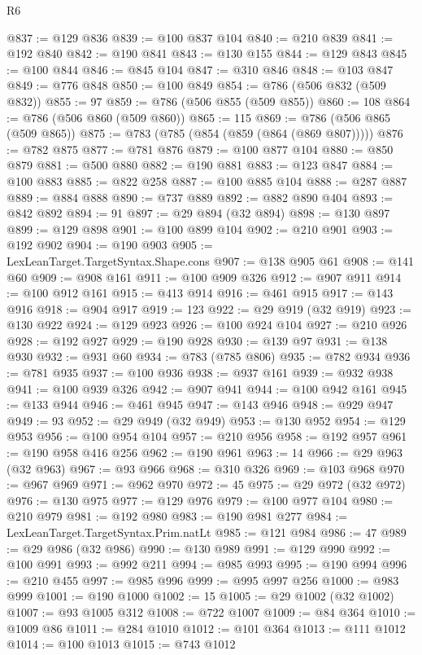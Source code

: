 \begin{lexlean}{R6}
\begin{coremodule}
@837 := @129 @836
@839 := @100 @837 @104
@840 := @210 @839
@841 := @192 @840
@842 := @190 @841
@843 := @130 @155
@844 := @129 @843
@845 := @100 @844
@846 := @845 @104
@847 := @310 @846
@848 := @103 @847
@849 := @776 @848
@850 := @100 @849
@854 := @786 (@506 @832 (@509 @832))
@855 := 97
@859 := @786 (@506 @855 (@509 @855))
@860 := 108
@864 := @786 (@506 @860 (@509 @860))
@865 := 115
@869 := @786 (@506 @865 (@509 @865))
@875 := @783 (@785 (@854 (@859 (@864 (@869 @807)))))
@876 := @782 @875
@877 := @781 @876
@879 := @100 @877 @104
@880 := @850 @879
@881 := @500 @880
@882 := @190 @881
@883 := @123 @847
@884 := @100 @883
@885 := @822 @258
@887 := @100 @885 @104
@888 := @287 @887
@889 := @884 @888
@890 := @737 @889
@892 := @882 @890 @404
@893 := @842 @892
@894 := 91
@897 := @29 @894 (@32 @894)
@898 := @130 @897
@899 := @129 @898
@901 := @100 @899 @104
@902 := @210 @901
@903 := @192 @902
@904 := @190 @903
@905 := LexLeanTarget.TargetSyntax.Shape.cons
@907 := @138 @905 @61
@908 := @141 @60
@909 := @908 @161
@911 := @100 @909 @326
@912 := @907 @911
@914 := @100 @912 @161
@915 := @413 @914
@916 := @461 @915
@917 := @143 @916
@918 := @904 @917
@919 := 123
@922 := @29 @919 (@32 @919)
@923 := @130 @922
@924 := @129 @923
@926 := @100 @924 @104
@927 := @210 @926
@928 := @192 @927
@929 := @190 @928
@930 := @139 @97
@931 := @138 @930
@932 := @931 @60
@934 := @783 (@785 @806)
@935 := @782 @934
@936 := @781 @935
@937 := @100 @936
@938 := @937 @161
@939 := @932 @938
@941 := @100 @939 @326
@942 := @907 @941
@944 := @100 @942 @161
@945 := @133 @944
@946 := @461 @945
@947 := @143 @946
@948 := @929 @947
@949 := 93
@952 := @29 @949 (@32 @949)
@953 := @130 @952
@954 := @129 @953
@956 := @100 @954 @104
@957 := @210 @956
@958 := @192 @957
@961 := @190 @958 @416 @256
@962 := @190 @961
@963 := 14
@966 := @29 @963 (@32 @963)
@967 := @93 @966
@968 := @310 @326
@969 := @103 @968
@970 := @967 @969
@971 := @962 @970
@972 := 45
@975 := @29 @972 (@32 @972)
@976 := @130 @975
@977 := @129 @976
@979 := @100 @977 @104
@980 := @210 @979
@981 := @192 @980
@983 := @190 @981 @277
@984 := LexLeanTarget.TargetSyntax.Prim.natLt
@985 := @121 @984
@986 := 47
@989 := @29 @986 (@32 @986)
@990 := @130 @989
@991 := @129 @990
@992 := @100 @991
@993 := @992 @211
@994 := @985 @993
@995 := @190 @994
@996 := @210 @455
@997 := @985 @996
@999 := @995 @997 @256
@1000 := @983 @999
@1001 := @190 @1000
@1002 := 15
@1005 := @29 @1002 (@32 @1002)
@1007 := @93 @1005 @312
@1008 := @722 @1007
@1009 := @84 @364
@1010 := @1009 @86
@1011 := @284 @1010
@1012 := @101 @364
@1013 := @111 @1012
@1014 := @100 @1013
@1015 := @743 @1012

\end{coremodule}
\end{lexlean}
